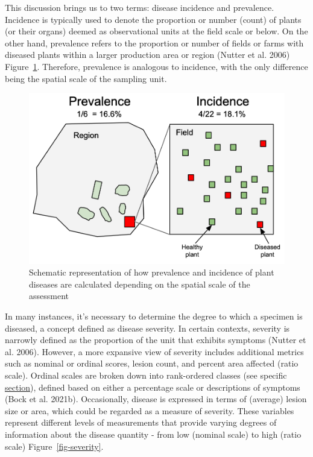 \documentclass[
  letterpaper,
]{book}
\begin{document}
This discussion brings us to two terms: disease incidence and
prevalence. Incidence is typically used to denote the proportion or
number (count) of plants (or their organs) deemed as observational units
at the field scale or below. On the other hand, prevalence refers to the
proportion or number of fields or farms with diseased plants within a
larger production area or region (Nutter et al. 2006)
Figure~\ref{fig-prevalence_incidence}. Therefore, prevalence is
analogous to incidence, with the only difference being the spatial scale
of the sampling unit.

\begin{figure}

{\centering \includegraphics[width=5in,height=\textheight]{imgs/prevalence_incidence.png}

}

\caption{\label{fig-prevalence_incidence}Schematic representation of how
prevalence and incidence of plant diseases are calculated depending on
the spatial scale of the assessment}

\end{figure}

In many instances, it's necessary to determine the degree to which a
specimen is diseased, a concept defined as disease severity. In certain
contexts, severity is narrowly defined as the proportion of the unit
that exhibits symptoms (Nutter et al. 2006). However, a more expansive
view of severity includes additional metrics such as nominal or ordinal
scores, lesion count, and percent area affected (ratio scale). Ordinal
scales are broken down into rank-ordered classes (see specific
\href{data-ordinal.html}{section}), defined based on either a percentage
scale or descriptions of symptoms (Bock et al. 2021b). Occasionally,
disease is expressed in terms of (average) lesion size or area, which
could be regarded as a measure of severity. These variables represent
different levels of measurements that provide varying degrees of
information about the disease quantity - from low (nominal scale) to
high (ratio scale) Figure~\ref{fig-severity}.
\end{document}
